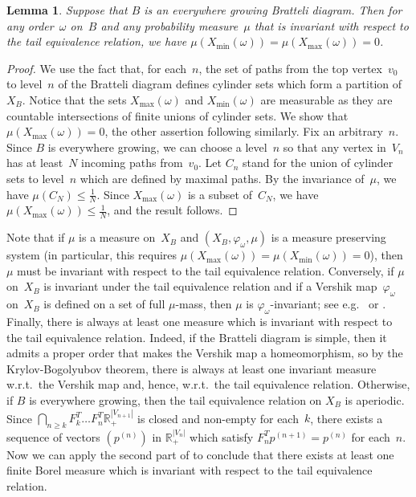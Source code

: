 \documentclass{amsart}
\newtheorem{lemma}{Lemma}[section]
\theoremstyle{definition}
\theoremstyle{remark}
\numberwithin{equation}{section}
\begin{document}
\begin{lemma}\label{small_base}
Suppose that $B$ is an everywhere growing Bratteli diagram. 
Then for any order~$\omega$ on~$B$ and any probability measure~$\mu$ that is invariant with respect to the tail equivalence relation, we have $\mu(X_{\min}(\omega)) =\mu(X_{\max}(\omega)) = 0$. 
\end{lemma}

\begin{proof}
We use the fact that, for each~$n$, the set of paths from the top vertex~$v_0$ to level~$n$ of the Bratteli diagram defines cylinder sets which form a partition of~$X_B$.
Notice that the sets $X_{\max}(\omega)$ and $X_{\min}(\omega)$ are measurable as they are countable intersections of  finite unions of cylinder sets.
We show that  $\mu(X_{\max}(\omega))=0$, the other assertion following similarly. 
Fix an arbitrary~$n$. 
Since $B$ is everywhere growing, we can choose a level~$n$ so that any vertex in~$V_n$ has at least~$N$ incoming paths from~$v_0$. 
Let $C_n$ stand for the union of cylinder sets to level~$n$  which are defined by maximal paths. 
By the invariance of~$\mu$, we have $\mu(C_N) \le \frac{1}{N}$. 
Since $X_{\max}(\omega)$ is a subset of~$C_N$, we have $\mu(X_{\max}(\omega)) \le \frac{1}{N}$, and the result follows. 
\end{proof}

Note that if $\mu$ is a measure on~$X_B$ and $(X_B, \varphi_\omega,\mu)$ is a measure preserving system (in particular, this requires $\mu( X_{\max}(\omega)) = \mu(X_{\min}(\omega)) = 0$), then $\mu$ must be invariant with respect to the tail equivalence relation. 
Conversely, if $\mu$ on~$X_B$ is invariant under the tail equivalence relation and if a Vershik map~$\varphi_\omega$ on~$X_B$ is defined on a set of full $\mu$-mass, then $\mu$ is $\varphi_\omega$-invariant; see e.g.~\cite[Lemma~2.7]{BKMS:2010} or \cite[Proposition~2.11]{Fisher:09}.  
Finally, there is always at least one measure which is invariant with respect to the tail equivalence relation. 
Indeed, if the Bratteli diagram is simple, then it admits a proper order that makes the Vershik map a homeomorphism, so by the Krylov-Bogolyubov theorem, there is always at least one invariant measure w.r.t.\ the Vershik map and, hence, w.r.t.\ the tail equivalence relation. 
Otherwise, if $B$ is everywhere growing, then  the tail equivalence relation on $X_B$ is aperiodic.
Since $\bigcap_{n\geq k}F_k^T \ldots F_n^T \mathbb{R}_{+}^{|V_{n+1}|}$ is closed and non-empty for each~$k$, there exists a sequence of vectors $(p^{(n)})$ in $\mathbb R_{+}^{|V_n|}$ which satisfy $F_n^T p^{(n+1)}=p^{(n)}$ for each~$n$.
Now we can apply the second part of  \cite[Theorem 2.11]{BKMS:2010} to conclude that there exists at least one finite Borel measure which is invariant with respect to the tail equivalence relation.
\end{document}
